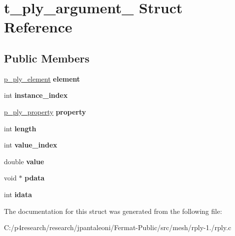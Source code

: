 \hypertarget{structt__ply__argument__}{}\section{t\+\_\+ply\+\_\+argument\+\_\+ Struct Reference}
\label{structt__ply__argument__}
\subsection*{Public Members}
\begin{DoxyCompactItemize}
\item 
\mbox{\label{structt__ply__argument___a958bc37961f8ee44b39f72f0b221c0d7}} 
\hyperlink{structt__ply__element__}{p\+\_\+ply\+\_\+element} {\bfseries element}
\item 
\mbox{\label{structt__ply__argument___a75f82512fbfd8133625fc184326dd9ee}} 
int {\bfseries instance\+\_\+index}
\item 
\mbox{\label{structt__ply__argument___af38f3661a7ba2930c910027bd36790c4}} 
\hyperlink{structt__ply__property__}{p\+\_\+ply\+\_\+property} {\bfseries property}
\item 
\mbox{\label{structt__ply__argument___a5acea699dab50c9e4da9d7122ec00897}} 
int {\bfseries length}
\item 
\mbox{\label{structt__ply__argument___a83877ef8f116282a66db4be8e38af65a}} 
int {\bfseries value\+\_\+index}
\item 
\mbox{\label{structt__ply__argument___ab4b092f2a002c13a39c251051d620b31}} 
double {\bfseries value}
\item 
\mbox{\label{structt__ply__argument___a33ffaef6d9affc8dd4322fff0856fd3e}} 
void $\ast$ {\bfseries pdata}
\item 
\mbox{\label{structt__ply__argument___a6ed97fc5766c034f98bd5abb1e59ed71}} 
int {\bfseries idata}
\end{DoxyCompactItemize}


The documentation for this struct was generated from the following file\+:\begin{DoxyCompactItemize}
\item 
C\+:/p4research/research/jpantaleoni/\+Fermat-\/\+Public/src/mesh/rply-\/1./rply.\+c\end{DoxyCompactItemize}

